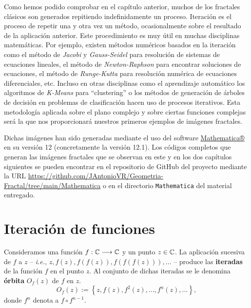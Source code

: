 
Como hemos podido comprobar en el capítulo anterior, muchos de los fractales clásicos son generados repitiendo indefinidamente un proceso. Iteración es el proceso de repetir una y otra vez un método, ocasionalmente sobre el resultado de la aplicación anterior. Este procedimiento es muy útil en muchas disciplinas matemáticas. Por ejemplo, existen métodos numéricos basados en la iteración como el método de \textit{Jacobi} y \textit{Gauss-Seidel} para resolución de sistemas de ecuaciones lineales, el método de \textit{Newton-Raphson} para encontrar soluciones de ecuaciones, el método de \textit{Runge-Kutta} para resolución numérica de ecuaciones diferenciales, etc. Incluso en otras disciplinas como el aprendizaje automático los algoritmos de \textit{K-Means} para ``clustering'' o los métodos de generación de árboles de decisión en problemas de clasificación hacen uso de procesos iterativos. Esta metodología aplicada sobre el plano complejo y sobre ciertas funciones complejas será la que nos proporcionará nuestros primeros ejemplos de imágenes fractales.

Dichas imágenes han sido generadas mediante el uso del software \textcolor{blue}{\href{https://www.wolfram.com/mathematica/}{Mathematica®}} en su versión 12 (concretamente la versión 12.1). Los códigos completos que generan las imágenes fractales que se observan en este y en los dos capítulos siguientes se pueden encontrar en el repositorio de GitHub del proyecto mediante la URL \url{https://github.com/JAntonioVR/Geometria-Fractal/tree/main/Mathematica} o en el directorio \texttt{Mathematica} del material entregado.

\section{Iteración de funciones}
\begin{definicion}
    Consideramos una función $f:\mathbb{C}\longrightarrow\mathbb{C}$ y un punto $z\in\mathbb{C}$. La aplicación sucesiva de $f$ a $z$ -- \textit{i.e.}, $z,f(z),f(f(z)), f(f(f(z))),\dots$ -- produce las \textbf{iteradas} de la función $f$ en el punto $z$. Al conjunto de dichas iteradas se le denomina \textbf{órbita} $O_f(z)$ de $f$ en $z$.
    $$
    O_f(z):=\left\lbrace z, f(z), f^2(z), \dots, f^n(z), \dots\right\rbrace,
    $$
    donde $f^n$ denota a $f\circ f^{n-1}$.
\end{definicion}

